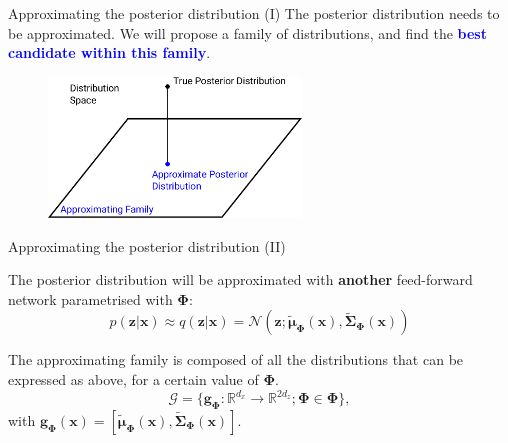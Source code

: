 \documentclass{beamer}
\newcommand{\MN}{{\mathcal N}}
\newcommand{\bs}[1]{\boldsymbol{#1}}
\begin{document}
\begin{frame}{Approximating the posterior distribution (I)}
 The posterior distribution needs to be approximated. We will propose a family of distributions, and find the \textbf{\textcolor{blue}{best candidate within this family}}.\vspace{3mm}\\
 
 \begin{figure}
  \centering
  \includegraphics[width=0.6\textwidth]{fig/distribution_projection.pdf}
 \end{figure}

\end{frame}

\begin{frame}{Approximating the posterior distribution (II)}

 The posterior distribution will be approximated with \textbf{another} feed-forward network parametrised with $\bs{\Phi}$:
 \begin{equation}p(\bs{z}|\bs{x})\approx q(\bs{z}|\bs{x}) = \MN(\bs{z};\tilde{\bs{\mu}}_{\bs{\Phi}}(\bs{x}),\tilde{\bs{\Sigma}}_{\bs{\Phi}}(\bs{x}))\end{equation}
 
 The approximating family is composed of all the distributions that can be expressed as above, for a certain value of $\bs{\Phi}$.
 \begin{equation}\mathcal{G} = \{ \bs{g}_{\bs{\Phi}}:\mathbb{R}^{d_x}\rightarrow\mathbb{R}^{2d_z};\bs{\Phi}\in\bs{\Phi} \},\end{equation}
 with $\bs{g}_{\bs{\Phi}}(\bs{x}) = [\tilde{\bs{\mu}}_{\bs{\Phi}}(\bs{x}),\tilde{\bs{\Sigma}}_{\bs{\Phi}}(\bs{x})]$.
\end{frame}
\end{document}
